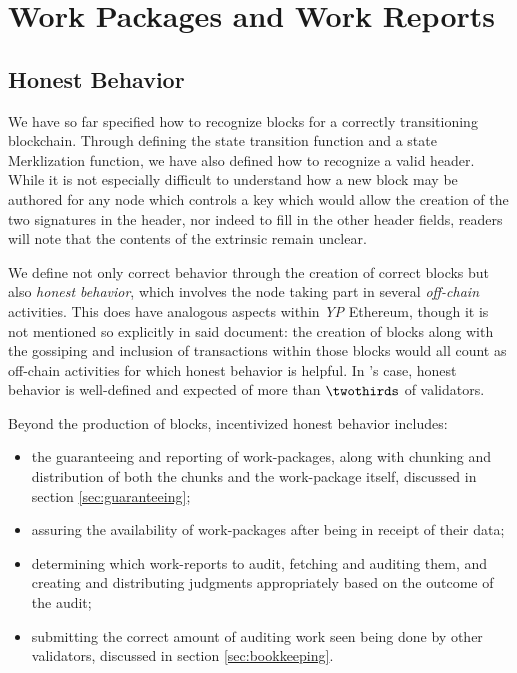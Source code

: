 \section{Work Packages and Work Reports}\label{sec:workpackagesandworkreports}

\newcommand*{\newavailabilityspecifier}{A}
\newcommand*{\itemtodigest}{C}
\newcommand*{\countupexports}{I}
\newcommand*{\importsegmentdata}{S}
\newcommand*{\justifysegmentdata}{J}
\newcommand*{\segrootlookup}{L}
\newcommand*{\pagedproofs}{P}
\newcommand*{\marshallrefine}{R}
\newcommand*{\extrinsicdata}{X}
\newcommand*{\wpX}{p}
\newcommand*{\wiX}{w}
\newcommand*{\segsX}{\mathbf{b}}
\newcommand*{\allexports}{\overline{\mathbf{e}}}

\subsection{Honest Behavior}

We have so far specified how to recognize blocks for a correctly transitioning \Jam blockchain. Through defining the state transition function and a state Merklization function, we have also defined how to recognize a valid header. While it is not especially difficult to understand how a new block may be authored for any node which controls a key which would allow the creation of the two signatures in the header, nor indeed to fill in the other header fields, readers will note that the contents of the extrinsic remain unclear.

We define not only correct behavior through the creation of correct blocks but also \emph{honest behavior}, which involves the node taking part in several \emph{off-chain} activities. This does have analogous aspects within \emph{YP} Ethereum, though it is not mentioned so explicitly in said document: the creation of blocks along with the gossiping and inclusion of transactions within those blocks would all count as off-chain activities for which honest behavior is helpful. In \Jam's case, honest behavior is well-defined and expected of more than $\twothirds$ of validators.

Beyond the production of blocks, incentivized honest behavior includes:
\begin{itemize}
    \item the guaranteeing and reporting of work-packages, along with chunking and distribution of both the chunks and the work-package itself, discussed in section \ref{sec:guaranteeing};
    \item assuring the availability of work-packages after being in receipt of their data;
    \item determining which work-reports to audit, fetching and auditing them, and creating and distributing judgments appropriately based on the outcome of the audit;
    \item submitting the correct amount of auditing work seen being done by other validators, discussed in section \ref{sec:bookkeeping}.
\end{itemize}

